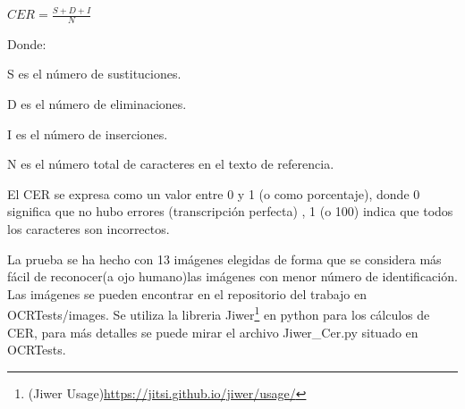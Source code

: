	$CER = \frac{S+D+I}{N} $ 



Donde:

S es el número de sustituciones.

D es el número de eliminaciones.

I es el número de inserciones.

N es el número total de caracteres en el texto de referencia.





El CER se expresa como un valor entre 0 y 1 (o como porcentaje), donde 0 significa que no hubo errores (transcripción perfecta) , 1 (o 100) indica que todos los caracteres son incorrectos.


La prueba se ha hecho con 13 imágenes elegidas de forma que se considera más fácil de reconocer(a ojo humano)las imágenes con menor número de identificación.
Las imágenes se pueden encontrar en el repositorio del trabajo en OCRTests/images.
Se utiliza la libreria Jiwer\footnote{(Jiwer Usage)\url {https://jitsi.github.io/jiwer/usage/}} en python para los cálculos de CER, para más detalles se puede mirar el archivo Jiwer\_Cer.py situado en OCRTests.

